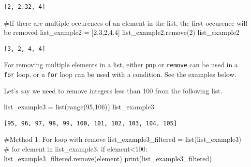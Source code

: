 \documentclass[
  letterpaper,
  DIV=11,
  numbers=noendperiod]{scrreprt}
\newenvironment{Shaded}{\begin{snugshade}}{\end{snugshade}}
\newcommand{\BuiltInTok}[1]{\textcolor[rgb]{0.00,0.23,0.31}{#1}}
\newcommand{\CommentTok}[1]{\textcolor[rgb]{0.37,0.37,0.37}{#1}}
\newcommand{\ControlFlowTok}[1]{\textcolor[rgb]{0.00,0.23,0.31}{#1}}
\newcommand{\DecValTok}[1]{\textcolor[rgb]{0.68,0.00,0.00}{#1}}
\newcommand{\KeywordTok}[1]{\textcolor[rgb]{0.00,0.23,0.31}{#1}}
\newcommand{\NormalTok}[1]{\textcolor[rgb]{0.00,0.23,0.31}{#1}}
\newcommand{\OperatorTok}[1]{\textcolor[rgb]{0.37,0.37,0.37}{#1}}
\begin{document}
\begin{verbatim}
[2, 2.32, 4]
\end{verbatim}

\begin{Shaded}
\begin{Highlighting}[]
\CommentTok{\#If there are multiple occurences of an element in the list, the first occurence will be removed}
\NormalTok{list\_example2 }\OperatorTok{=}\NormalTok{ [}\DecValTok{2}\NormalTok{,}\DecValTok{3}\NormalTok{,}\DecValTok{2}\NormalTok{,}\DecValTok{4}\NormalTok{,}\DecValTok{4}\NormalTok{]}
\NormalTok{list\_example2.remove(}\DecValTok{2}\NormalTok{)}
\NormalTok{list\_example2}
\end{Highlighting}
\end{Shaded}

\begin{verbatim}
[3, 2, 4, 4]
\end{verbatim}

For removing multiple elements in a list, either \texttt{pop} or
\texttt{remove} can be used in a \texttt{for} loop, or a \texttt{for}
loop can be used with a condition. See the examples below.

Let's say we need to remove integers less than 100 from the following
list.

\begin{Shaded}
\begin{Highlighting}[]
\NormalTok{list\_example3 }\OperatorTok{=} \BuiltInTok{list}\NormalTok{(}\BuiltInTok{range}\NormalTok{(}\DecValTok{95}\NormalTok{,}\DecValTok{106}\NormalTok{))}
\NormalTok{list\_example3}
\end{Highlighting}
\end{Shaded}

\begin{verbatim}
[95, 96, 97, 98, 99, 100, 101, 102, 103, 104, 105]
\end{verbatim}

\begin{Shaded}
\begin{Highlighting}[]
\CommentTok{\#Method 1: For loop with remove}
\NormalTok{list\_example3\_filtered }\OperatorTok{=} \BuiltInTok{list}\NormalTok{(list\_example3) }\CommentTok{\#}
\ControlFlowTok{for}\NormalTok{ element }\KeywordTok{in}\NormalTok{ list\_example3:}
    \ControlFlowTok{if}\NormalTok{ element}\OperatorTok{\textless{}}\DecValTok{100}\NormalTok{:}
\NormalTok{        list\_example3\_filtered.remove(element)}
\BuiltInTok{print}\NormalTok{(list\_example3\_filtered)}
\end{Highlighting}
\end{Shaded}
\end{document}
